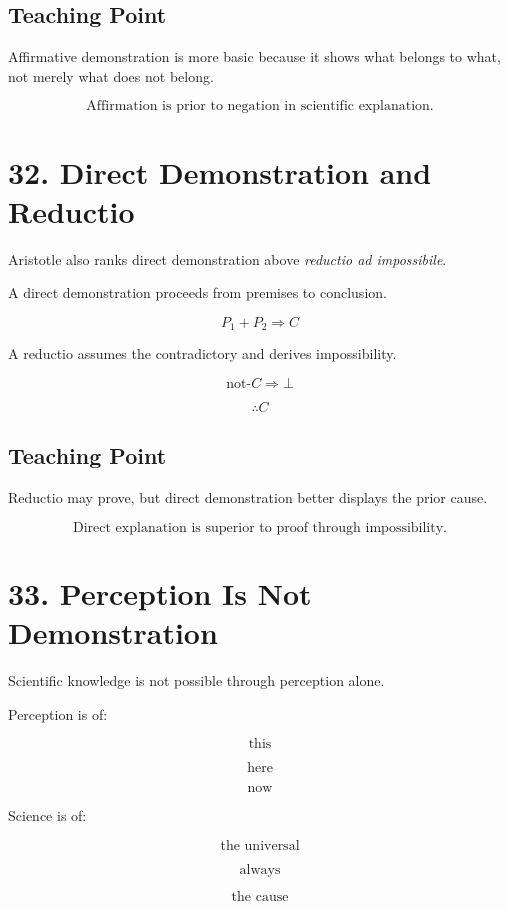 \documentclass[12pt]{article}
\begin{document}
\subsection*{Teaching Point}

Affirmative demonstration is more basic because it shows what belongs to what,
not merely what does not belong.

\[
\boxed{
\text{Affirmation is prior to negation in scientific explanation.}
}
\]

\section*{32. Direct Demonstration and Reductio}

Aristotle also ranks direct demonstration above \textit{reductio ad
impossibile}.

A direct demonstration proceeds from premises to conclusion.

\[
P_1 + P_2 \Rightarrow C
\]

A reductio assumes the contradictory and derives impossibility.

\[
\text{not-}C \Rightarrow \bot
\]

\[
\therefore C
\]

\subsection*{Teaching Point}

Reductio may prove, but direct demonstration better displays the prior cause.

\[
\boxed{
\text{Direct explanation is superior to proof through impossibility.}
}
\]

\section*{33. Perception Is Not Demonstration}

Scientific knowledge is not possible through perception alone.

Perception is of:

\[
\text{this}
\]

\[
\text{here}
\]

\[
\text{now}
\]

Science is of:

\[
\text{the universal}
\]

\[
\text{always}
\]

\[
\text{the cause}
\]
\end{document}
